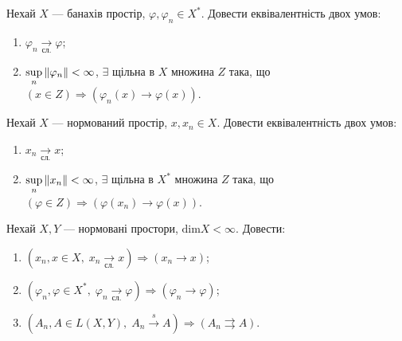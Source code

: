 
\begin{exercise}
    Нехай $X$ --- банахів простір, $\varphi, \varphi_n \in X^{*}$.
    Довести еквівалентність двох умов:
    \begin{enumerate}
        \item $\varphi_n \underset{\text{сл.}}{\rightarrow} \varphi$;
        \item $\underset{n}{\sup}\left\lVert\varphi_n\right\rVert < \infty$, $\exists$ щільна
        в $X$ множина $Z$ така, що $(x \in Z) \Rightarrow (\varphi_n (x) \rightarrow \varphi(x))$.
    \end{enumerate}
\end{exercise}

\begin{exercise}
    Нехай $X$ --- нормований простір, $x, x_n \in X$.
    Довести еквівалентність двох умов:
    \begin{enumerate}
        \item $x_n \underset{\text{сл.}}{\rightarrow} x$;
        \item $\underset{n}{\sup}\left\lVert x_n\right\rVert < \infty$, $\exists$ щільна
        в $X^{*}$ множина $Z$ така, що $(\varphi \in Z) \Rightarrow (\varphi (x_n) \rightarrow \varphi(x))$.
    \end{enumerate}
\end{exercise}

\begin{exercise}
    Нехай $X, Y$ --- нормовані простори, $\mathrm{dim}X < \infty$. Довести:
    \begin{enumerate}
        \item $\left(x_n, x \in X, \; x_n \underset{\text{сл.}}{\rightarrow} x\right) \Rightarrow \left(x_n \rightarrow x\right)$;
        \item $\left(\varphi_n, \varphi \in X^{*}, \; \varphi_n \underset{\text{сл.}}{\rightarrow} \varphi\right) \Rightarrow \left(\varphi_n \rightarrow \varphi\right)$;
        \item $\left(A_n, A \in L(X, Y), \; A_n \overset{s}{\rightarrow} A\right) \Rightarrow \left(A_n \rightrightarrows A\right)$.
    \end{enumerate}
\end{exercise}

